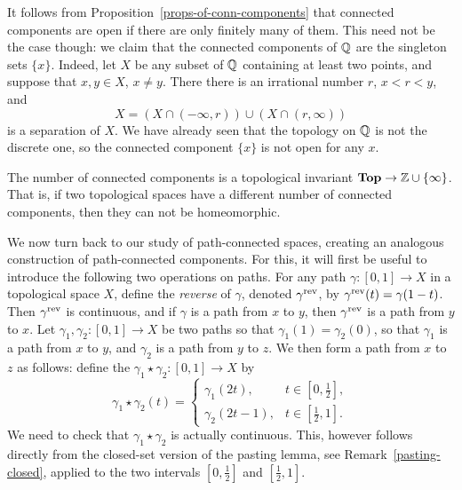 \begin{example}
  It follows from Proposition~\ref{props-of-conn-components} that connected components are open if there are only finitely many of them. This need not be the case though: we claim that the connected components of $\mathbb{Q}$ are the singleton sets $\{x\}$. Indeed, let $X$ be any subset of $\mathbb{Q}$ containing at least two points, and suppose that $x, y \in X$, $x \not= y$. There there is an irrational number $r$, $x < r < y$, and 
  \[
    X = (X \cap (-\infty,r)) \cup (X \cap (r,\infty))
  \]
  is a separation of $X$. We have already seen that the topology on $\mathbb{Q}$ is not the discrete one, so the connected component $\{x\}$ is not open for any $x$.
\end{example}
\begin{rem}
  The number of connected components is a topological invariant $\mathbf{Top} \to \mathbb{Z} \cup \{\infty\}$. That is, if two topological spaces have a different number of connected components, then they can not be homeomorphic.
\end{rem}

We now turn back to our study of path-connected spaces, creating an analogous construction of path-connected components. For this, it will first be useful to introduce the following two operations on paths. For any path $\gamma : [0,1] \to X$ in a topological space $X$, define the \emph{reverse} of $\gamma$, denoted $\gamma^{\mathrm{rev}}$, by $\gamma^{\mathrm{rev}}(t) = \gamma(1-t)$. Then $\gamma^{\mathrm{rev}}$ is continuous, and if $\gamma$ is a path from $x$ to $y$, then $\gamma^{\mathrm{rev}}$ is a path from $y$ to $x$. Let $\gamma_1,\gamma_2 : [0,1] \to X$ be two paths so that $\gamma_1(1) = \gamma_2(0)$, so that $\gamma_1$ is a path from $x$ to $y$, and $\gamma_2$ is a path from $y$ to $z$. We then form a path from $x$ to $z$ as follows: define the  $\gamma_1 \star \gamma_2 : [0,1] \to X$ by
\[
  \gamma_1 \star \gamma_2(t) = \begin{cases} \gamma_1(2t), & t \in [0,\tfrac{1}{2}],\\ \gamma_2(2t-1), & t \in [\tfrac{1}{2},1]. \end{cases}
\]
We need to check that $\gamma_1 \star \gamma_2$ is actually continuous. This, however follows directly from the closed-set version of the pasting lemma, see Remark~\ref{pasting-closed}, applied to the two intervals $[0,\tfrac{1}{2}]$ and $[\tfrac{1}{2},1]$.

